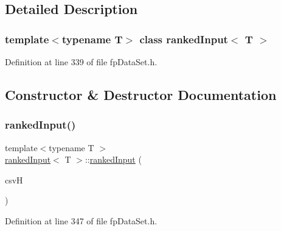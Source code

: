 \subsection{Detailed Description}
\subsubsection*{template$<$typename T$>$\newline
class ranked\+Input$<$ T $>$}



Definition at line 339 of file fp\+Data\+Set.\+h.



\subsection{Constructor \& Destructor Documentation}
\mbox{\label{classrankedInput_a68fd13cc8d6784da58717a85f811fbf3}} 
\subsubsection{\texorpdfstring{ranked\+Input()}{rankedInput()}\hspace{0.1cm}{\footnotesize\ttfamily [1/2]}}
{\footnotesize\ttfamily template$<$typename T $>$ \\
\hyperlink{classrankedInput}{ranked\+Input}$<$ T $>$\+::\hyperlink{classrankedInput}{ranked\+Input} (\begin{DoxyParamCaption}\item[{\hyperlink{classcsvHandle}{csv\+Handle} \&}]{csvH }\end{DoxyParamCaption})\hspace{0.3cm}{\ttfamily [inline]}}



Definition at line 347 of file fp\+Data\+Set.\+h.


